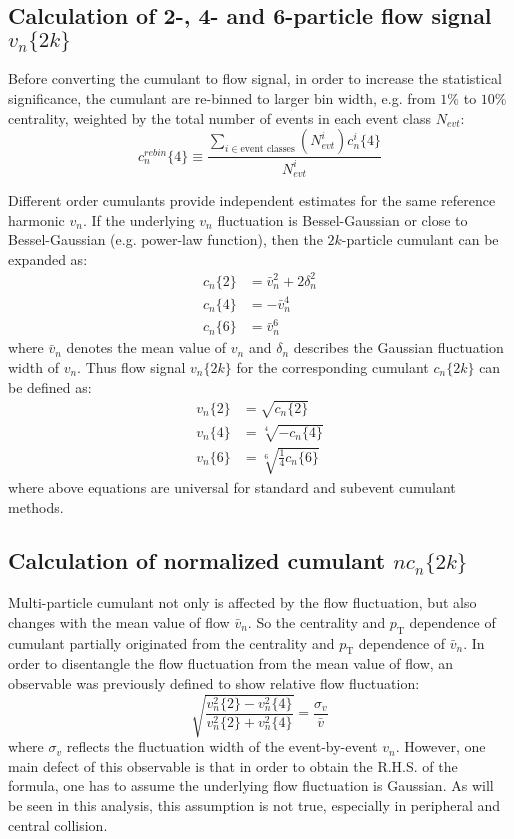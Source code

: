 \subsection{Calculation of 2-, 4- and 6-particle flow signal $v_n\{2k\}$}
Before converting the cumulant to flow signal, in order to increase the statistical significance, the cumulant are re-binned to larger bin width, e.g. from $1\%$ to $10\%$ centrality, weighted by the total number of events in each event class $N_{evt}$:
\begin{equation}
c_n^{rebin}\{4\}\equiv \frac{\sum_{i\in \text{event classes}} (N_{evt}^i)c_n^i\{4\}}{N_{evt}^i}
\end{equation}

Different order cumulants provide independent estimates for the same reference harmonic $v_n$. If the underlying $v_n$ fluctuation is Bessel-Gaussian or close to Bessel-Gaussian (e.g. power-law function), then the $2k$-particle cumulant can be expanded as:
\begin{equation}
\begin{split}
c_n\{2\} &= \bar{v}_n^2+2\delta_n^2 \\
c_n\{4\} &= -\bar{v}_n^4 \\
c_n\{6\} &= \bar{v}_n^6
\end{split}
\end{equation}
where $\bar{v}_n$ denotes the mean value of $v_n$ and $\delta_n$ describes the Gaussian fluctuation width of $v_n$. Thus flow signal $v_n\{2k\}$ for the corresponding cumulant $c_n\{2k\}$ can be defined as:
\begin{equation}
\begin{split}
v_n\{2\} &= \sqrt{c_n\{2\}} \\
v_n\{4\} &= \sqrt[4]{-c_n\{4\}} \\
v_n\{6\} &= \sqrt[6]{\frac{1}{4}c_n\{6\}}
\end{split}
\end{equation}
where above equations are universal for standard and subevent cumulant methods.



\subsection{Calculation of normalized cumulant $nc_n\{2k\}$}
Multi-particle cumulant not only is affected by the flow fluctuation, but also changes with the mean value of flow $\bar{v}_n$. So the centrality and $p_\text{T}$ dependence of cumulant partially originated from the centrality and $p_\text{T}$ dependence of $\bar{v}_n$. In order to disentangle the flow fluctuation from the mean value of flow, an observable was previously defined to show relative flow fluctuation:
\begin{equation}
\sqrt{\frac{v_n^2\{2\}-v_n^2\{4\}}{v_n^2\{2\}+v_n^2\{4\}}}=\frac{\sigma_v}{\bar{v}}
\end{equation}
where $\sigma_v$ reflects the fluctuation width of the event-by-event $v_n$. However, one main defect of this observable is that in order to obtain the R.H.S. of the formula, one has to assume the underlying flow fluctuation is Gaussian. As will be seen in this analysis, this assumption is not true, especially in peripheral and central collision.

